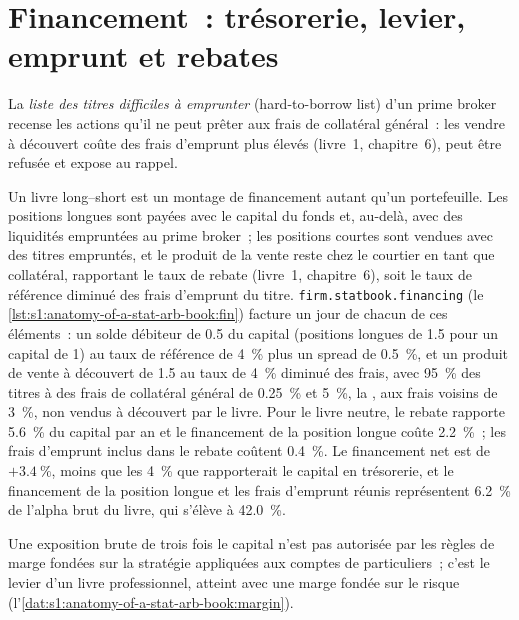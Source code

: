 \section{Financement~: trésorerie, levier, emprunt et rebates}

\begin{definition}\label{def:s1:anatomy-of-a-stat-arb-book:htb}
La \emph{liste des titres difficiles à emprunter} (hard-to-borrow list) d'un prime broker recense les actions qu'il ne peut prêter aux frais de collatéral général~: les vendre à
découvert coûte des frais d'emprunt plus élevés (livre~1, chapitre~6), peut être refusée et expose au rappel.
\end{definition}

Un livre long--short est un montage de financement autant qu'un portefeuille. Les positions longues sont payées avec le capital du fonds et, au-delà, avec des liquidités empruntées au
prime broker~; les positions courtes sont vendues avec des titres empruntés, et le produit de la vente reste chez le courtier en tant que collatéral, rapportant le taux de rebate (livre~1, chapitre~6),
soit le taux de référence diminué des frais d'emprunt du titre. \texttt{firm.statbook.financing} (le \cref{lst:s1:anatomy-of-a-stat-arb-book:fin}) facture un jour de chacun de ces éléments~: un
solde débiteur de 0.5 du capital (positions longues de 1.5 pour un capital de 1) au taux de référence de 4~\% plus un spread de 0.5~\%, et un produit de vente à découvert de 1.5 au taux de 4~\% diminué des frais,
avec 95~\% des titres à des frais de collatéral général de 0.25~\% et 5~\%, la , aux frais voisins de 3~\%, non vendus à découvert par le livre. Pour le
livre neutre, le rebate rapporte 5.6~\% du capital par an et le financement de la position longue coûte 2.2~\%~; les frais d'emprunt inclus dans le rebate coûtent 0.4~\%. Le financement net est de $+3.4~\%$,
moins que les 4~\% que rapporterait le capital en trésorerie, et le financement de la position longue et les frais d'emprunt réunis représentent 6.2~\% de l'alpha brut du livre, qui s'élève à 42.0~\%.

Une exposition brute de trois fois le capital n'est pas autorisée par les règles de marge fondées sur la stratégie appliquées aux comptes de particuliers~; c'est le levier d'un livre professionnel, atteint avec
une marge fondée sur le risque (l'\cref{dat:s1:anatomy-of-a-stat-arb-book:margin}).

